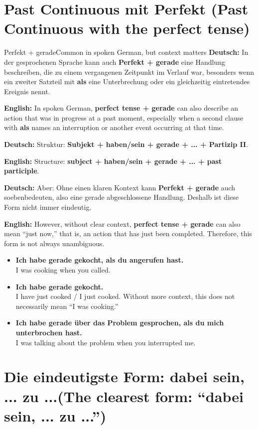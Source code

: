 \documentclass[a4paper,11pt]{article}
\newcommand{\GermanText}[1]{\textbf{Deutsch: }#1\par}
\newcommand{\EnglishText}[1]{{\small\color{SoftGray}\textbf{English: }#1\par}}
\newcommand{\ExampleItem}[2]{\item \textbf{#1}\\{\small\color{SoftGray}#2}}
\begin{document}
\section{Past Continuous mit Perfekt \textnormal{(Past Continuous with the perfect tense)}}

        \begin{grammarentry}{Perfekt + gerade}{Common in spoken German, but context matters}
            \GermanText{In der gesprochenen Sprache kann auch \textbf{Perfekt + gerade} eine Handlung beschreiben, die zu einem vergangenen Zeitpunkt im Verlauf war, besonders wenn ein zweiter Satzteil mit \textbf{als} eine Unterbrechung oder ein gleichzeitig eintretendes Ereignis nennt.}
            \EnglishText{In spoken German, \textbf{perfect tense + gerade} can also describe an action that was in progress at a past moment, especially when a second clause with \textbf{als} names an interruption or another event occurring at that time.}

            \GermanText{Struktur: \textbf{Subjekt + haben/sein + gerade + ... + Partizip II}.}
            \EnglishText{Structure: \textbf{subject + haben/sein + gerade + ... + past participle}.}

            \GermanText{Aber: Ohne einen klaren Kontext kann \textbf{Perfekt + gerade} auch \glqq soeben\grqq bedeuten, also eine gerade abgeschlossene Handlung. Deshalb ist diese Form nicht immer eindeutig.}
            \EnglishText{However, without clear context, \textbf{perfect tense + gerade} can also mean ``just now,'' that is, an action that has just been completed. Therefore, this form is not always unambiguous.}
        \end{grammarentry}

        \begin{exbox}
            \begin{itemize}
                \ExampleItem{Ich habe gerade gekocht, als du angerufen hast.}{I was cooking when you called.}
                \ExampleItem{Ich habe gerade gekocht.}{I have just cooked / I just cooked. Without more context, this does not necessarily mean ``I was cooking.''}
                \ExampleItem{Ich habe gerade über das Problem gesprochen, als du mich unterbrochen hast.}{I was talking about the problem when you interrupted me.}
            \end{itemize}
        \end{exbox}

\section{Die eindeutigste Form: \glqq dabei sein, ... zu ...\grqq \textnormal{(The clearest form: ``dabei sein, ... zu ...'')}}
\end{document}
